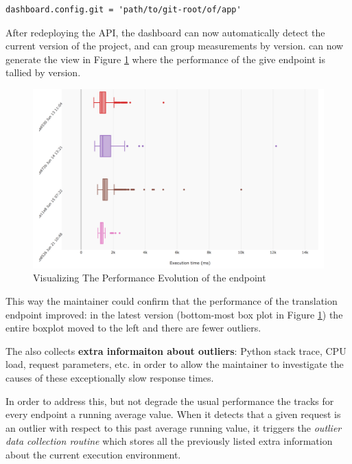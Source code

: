 \documentclass[conference]{IEEEtran}
\begin{document}
  \begin{lstlisting}[style=custompython]
  dashboard.config.git = 'path/to/git-root/of/app'
  \end{lstlisting}

  After redeploying the API, the dashboard can now automatically detect the current version of the project, and can group measurements by version. \tool can now generate the view in Figure \ref{fig:tee} where the performance of the give endpoint is tallied by version.

  \begin{figure}[h!]
    \centering
    \includegraphics[width=\linewidth]{translation_endpoint_evolution.png}
    \caption{Visualizing The Performance Evolution of the \epTranslations endpoint}
    \label{fig:tee}
  \end{figure}

  This way the maintainer could confirm that the performance of the translation endpoint improved: in the latest version (bottom-most box plot in Figure \ref{fig:tee}) the entire boxplot moved to the left and there are fewer outliers.


  \niceseparator

  The \tool also collects {\bf extra informaiton about outliers}: Python stack trace, CPU load, request parameters, etc. in order to allow the maintainer to investigate the causes of these exceptionally slow response times. 

  In order to address this, but not degrade the usual performance the \tool tracks for every endpoint a running average value. When it detects that a given request is an outlier with respect to this past average running value, it triggers the {\em outlier data collection routine} which stores all the previously listed extra information about the current execution environment. 
\end{document}
